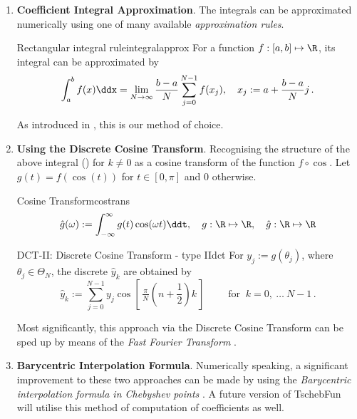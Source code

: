 \documentclass[12pt, a4paper]{article}
\newcommand{\tschebfun}{\textcolor{themecolor3}{TschebFun}\xspace}
\begin{document}
  \begin{enumerate}
    \item \textbf{Coefficient Integral Approximation}.
          The integrals can be approximated numerically using one of many available \textit{approximation rules}.
          \begin{theorem}{Rectangular integral rule}{integralapprox}
            For a function $f: [a, b] \mapsto \R$, its integral can be approximated by
            $$\int_a^b f(x) \ddx = \lim_{N \rightarrow \infty} \frac{b-a}{N} \sum_{j=0}^{N-1} f(x_j), \quad x_j := a + \frac{b-a}{N} j \,.$$
          \end{theorem}
          As introduced in \cite{bonthuis-cp}, this is our method of choice.

    \item \textbf{Using the Discrete Cosine Transform}.
          Recognising the structure of the above integral () for $k \neq 0$ as a cosine transform of the function $f \circ \cos$. Let $g(t) = f(\cos(t))$ for $t \in [0, \pi]$ and $0$ otherwise.

          \begin{definition}{Cosine Transform}{costrans}
            $$\hat{g}(\omega) := \int_{-\infty}^{\infty} g(t) \cos(\omega t) \ddt, \quad g: \R \mapsto \R, \quad \hat{g}: \R \mapsto \R$$
          \end{definition}
          \vspace*{-0.5cm}
          \begin{definition}{DCT-II: Discrete Cosine Transform - type II}{dct}
            For $y_j := g(\theta_j)$, where $\theta_j \in \Theta_N$, the discrete $\hat{y}_k$ are obtained by
            $$\hat{y}_k := \sum_{j=0}^{N-1}y_{j}\cos \left[\,{\tfrac {\,\pi \,}{N}}\left(n+{\frac {1}{2}}\right)k\,\right]\qquad {\text{ for }}~k=0,\ \dots \ N-1\,.$$
          \end{definition}

          Most significantly, this approach via the Discrete Cosine Transform can be sped up by means of the \emph{Fast Fourier Transform} \parencite{cooley-tukey-fft}.

    \item \textbf{Barycentric Interpolation Formula}.
          Numerically speaking, a significant improvement to these two approaches can be made by using the \emph{Barycentric interpolation formula in Chebyshev points} \parencite{atap}. A future version of \tschebfun will utilise this method of computation of coefficients as well.
  \end{enumerate}
\end{document}
